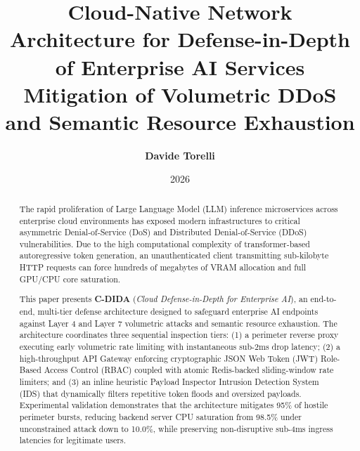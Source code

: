 \documentclass[11pt,a4paper]{report}
\title{\textbf{Cloud-Native Network Architecture for Defense-in-Depth of Enterprise AI Services}\\
\large Mitigation of Volumetric DDoS and Semantic Resource Exhaustion}
\author{\textbf{Davide Torelli}}
\date{2026}
\begin{document}
\maketitle

\begin{abstract}
The rapid proliferation of Large Language Model (LLM) inference microservices across enterprise cloud environments has exposed modern infrastructures to critical asymmetric Denial-of-Service (DoS) and Distributed Denial-of-Service (DDoS) vulnerabilities. Due to the high computational complexity of transformer-based autoregressive token generation, an unauthenticated client transmitting sub-kilobyte HTTP requests can force hundreds of megabytes of VRAM allocation and full GPU/CPU core saturation. 

This paper presents \textbf{C-DIDA} (\textit{Cloud Defense-in-Depth for Enterprise AI}), an end-to-end, multi-tier defense architecture designed to safeguard enterprise AI endpoints against Layer 4 and Layer 7 volumetric attacks and semantic resource exhaustion. The architecture coordinates three sequential inspection tiers: (1) a perimeter reverse proxy executing early volumetric rate limiting with instantaneous sub-2ms drop latency; (2) a high-throughput API Gateway enforcing cryptographic JSON Web Token (JWT) Role-Based Access Control (RBAC) coupled with atomic Redis-backed sliding-window rate limiters; and (3) an inline heuristic Payload Inspector Intrusion Detection System (IDS) that dynamically filters repetitive token floods and oversized payloads. Experimental validation demonstrates that the architecture mitigates 95\% of hostile perimeter bursts, reducing backend server CPU saturation from 98.5\% under unconstrained attack down to 10.0\%, while preserving non-disruptive sub-4ms ingress latencies for legitimate users.
\end{abstract}

\tableofcontents
\newpage







\end{document}
